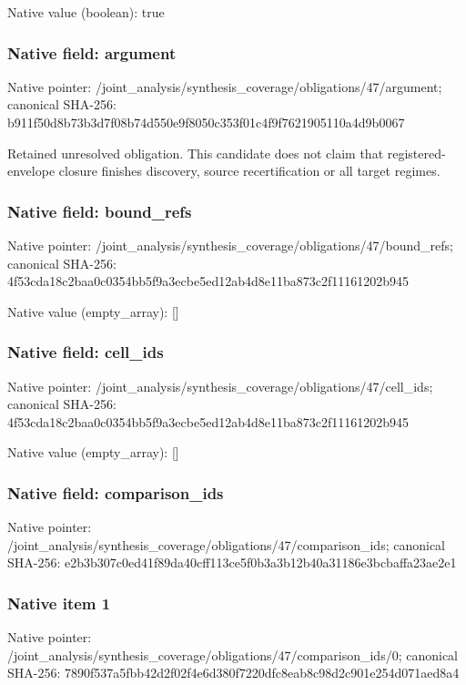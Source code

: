 \documentclass[10pt,a4paper]{article}
\begin{document}
Native value (boolean): true

\subsubsection{Native field: argument}
Native pointer: /joint\_\allowbreak{}analysis/synthesis\_\allowbreak{}coverage/obligations/47/argument; canonical SHA-256: b911f50d8b73b3d7f08b74d550e9f8050c353f01c4f9f7621905110a4d9b0067

\begingroup\raggedright\sloppy Retained unresolved obligation. This candidate does not claim that registered-envelope closure finishes discovery,\allowbreak{} source recertification or all target regimes.\par\endgroup

\subsubsection{Native field: bound\_\allowbreak{}refs}
Native pointer: /joint\_\allowbreak{}analysis/synthesis\_\allowbreak{}coverage/obligations/47/bound\_\allowbreak{}refs; canonical SHA-256: 4f53cda18c2baa0c0354bb5f9a3ecbe5ed12ab4d8e11ba873c2f11161202b945

Native value (empty\_\allowbreak{}array): []

\subsubsection{Native field: cell\_\allowbreak{}ids}
Native pointer: /joint\_\allowbreak{}analysis/synthesis\_\allowbreak{}coverage/obligations/47/cell\_\allowbreak{}ids; canonical SHA-256: 4f53cda18c2baa0c0354bb5f9a3ecbe5ed12ab4d8e11ba873c2f11161202b945

Native value (empty\_\allowbreak{}array): []

\subsubsection{Native field: comparison\_\allowbreak{}ids}
Native pointer: /joint\_\allowbreak{}analysis/synthesis\_\allowbreak{}coverage/obligations/47/comparison\_\allowbreak{}ids; canonical SHA-256: e2b3b307c0ed41f89da40cff113ce5f0b3a3b12b40a31186e3bcbaffa23ae2e1

\subsubsection{Native item 1}
Native pointer: /joint\_\allowbreak{}analysis/synthesis\_\allowbreak{}coverage/obligations/47/comparison\_\allowbreak{}ids/0; canonical SHA-256: 7890f537a5fbb42d2f02f4e6d380f7220dfc8eab8c98d2c901e254d071aed8a4
\end{document}
